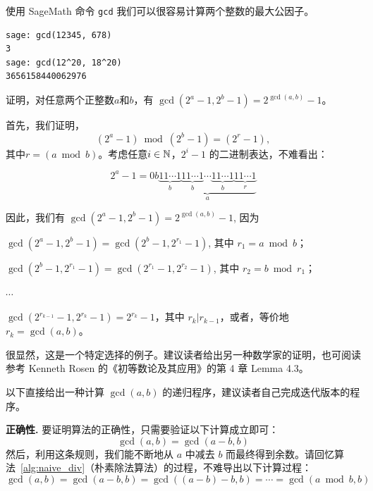 \begin{example}
\label{exm:gcd-in-sage}
使用 SageMath 命令 \lstinline{gcd} 我们可以很容易计算两个整数的最大公因子。
\begin{lstlisting}
sage: gcd(12345, 678)
3
sage: gcd(12^20, 18^20)
3656158440062976
\end{lstlisting}
\end{example}

\begin{example}
\label{exm:remainder}
证明，对任意两个正整数$a$和$b$，有 $\gcd(2^a - 1, 2^b -1) =  2^{\gcd(a,b)} -1$。

首先，我们证明，
\[(2^a - 1) \bmod (2^b - 1) = (2^r -1),\]
其中$r = (a \bmod b)$。考虑任意$i\in {\mathbb N}$，$2^i -1$ 的二进制表达，不难看出：

\[2^a - 1  =0b \underbrace{\underbrace{11\cdots 1}_{b} \underbrace{11\cdots 1}_{b} \cdots \underbrace{11\cdots 1}_{b} \underbrace{11\cdots 1}_{r}}_{a}\]

因此，我们有 $\gcd(2^a - 1, 2^b -1) =  2^{\gcd(a,b)} -1$, 因为

$\gcd(2^a - 1, 2^b -1) =  \gcd(2^b - 1, 2^{r_1} -1)$, 其中 $r_1 = a \bmod b$；

$\gcd(2^b - 1, 2^{r_1} -1) = \gcd(2^{r_1} - 1, 2^{r_2} -1)$, 其中 $r_2 = b \bmod r_1$；

$\cdots$

$\gcd(2^{r_{k-1}} - 1, 2^{r_{k}} - 1) = 2^{r_{k}} - 1$，其中 $r_k | r_{k-1}$，或者，等价地$r_k = \gcd(a, b)$。
\end{example}

\begin{thinking}
很显然，这是一个特定选择的例子。建议读者给出另一种数学家的证明，也可阅读参考 Kenneth Rosen 的《初等数论及其应用》\cite{Ros11ENTA}的第 4 章 Lemma 4.3。
\end{thinking}

以下直接给出一种计算 $\gcd(a, b)$ 的递归程序，建议读者自己完成迭代版本的程序。

\begin{center}
	
\end{center}

\noindent\textbf{正确性.} 要证明算法的正确性，只需要验证以下计算成立即可： 
\[\gcd(a, b) = \gcd(a - b,  b)\]
然后，利用这条规则，我们能不断地从 $a$ 中减去 $b$ 而最终得到余数。请回忆算法~\ref{alg:naive_div}（朴素除法算法）的过程，不难导出以下计算过程：
\[\gcd(a, b) = \gcd(a - b,  b) = \gcd((a - b) - b, b) = \cdots = \gcd(a \bmod b,  b)\]

